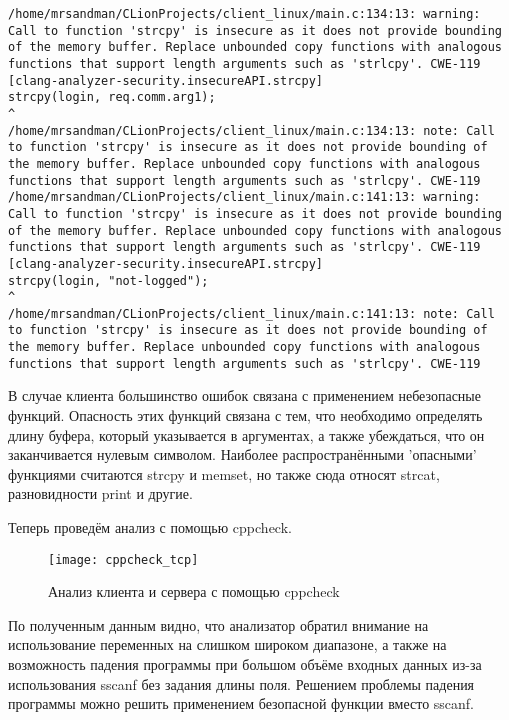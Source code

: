 \begin{itemize}
\begin{lstlisting}
/home/mrsandman/CLionProjects/client_linux/main.c:134:13: warning: Call to function 'strcpy' is insecure as it does not provide bounding of the memory buffer. Replace unbounded copy functions with analogous functions that support length arguments such as 'strlcpy'. CWE-119 [clang-analyzer-security.insecureAPI.strcpy]
strcpy(login, req.comm.arg1);
^
/home/mrsandman/CLionProjects/client_linux/main.c:134:13: note: Call to function 'strcpy' is insecure as it does not provide bounding of the memory buffer. Replace unbounded copy functions with analogous functions that support length arguments such as 'strlcpy'. CWE-119
/home/mrsandman/CLionProjects/client_linux/main.c:141:13: warning: Call to function 'strcpy' is insecure as it does not provide bounding of the memory buffer. Replace unbounded copy functions with analogous functions that support length arguments such as 'strlcpy'. CWE-119 [clang-analyzer-security.insecureAPI.strcpy]
strcpy(login, "not-logged");
^
/home/mrsandman/CLionProjects/client_linux/main.c:141:13: note: Call to function 'strcpy' is insecure as it does not provide bounding of the memory buffer. Replace unbounded copy functions with analogous functions that support length arguments such as 'strlcpy'. CWE-119
\end{lstlisting}

В случае клиента большинство ошибок связана с применением небезопасные функций. Опасность этих функций связана с тем, что необходимо определять длину буфера, который указывается в аргументах, а также убеждаться, что он заканчивается нулевым символом. Наиболее распространёнными 'опасными' функциями считаются strcpy и memset, но также сюда относят strcat, разновидности print и другие.

Теперь проведём анализ с помощью cppcheck.

\begin{figure}[H]
	\begin{center}
		\texttt{[image: cppcheck\_tcp]}
		\caption{Анализ клиента и сервера с помощью cppcheck} 
		\label{pic:cppcheck_tcp.png} %
	\end{center}
\end{figure}

По полученным данным видно, что анализатор обратил внимание на использование переменных на слишком широком диапазоне, а также на возможность падения программы при большом объёме входных данных из-за использования sscanf без задания длины поля. Решением проблемы падения программы можно решить применением безопасной функции вместо sscanf.


\end{itemize}

